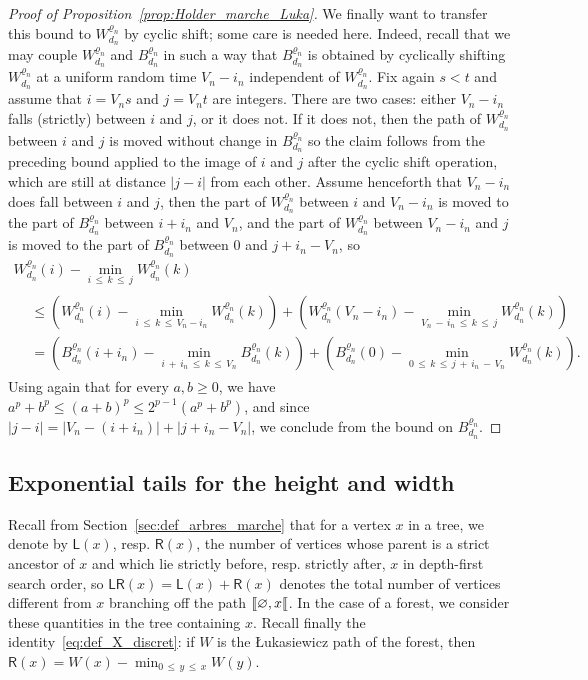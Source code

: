 \documentclass[AHL,Unicode,longabstracts,published]{cedram}
\newcommand{\llbracket}{\mathopen{[\mkern -2.7mu[}}
\newcommand{\1}{\ensembles{1}}
\renewcommand{\le}{\leqslant}
\renewcommand{\ge}{\geqslant}
\newcommand{\LL}{\mathsf{L}}
\newcommand{\RR}{\mathsf{R}}
\newcommand{\LR}{\mathsf{LR}}
\newcommand{\Wfn}{W_{d_n}^{\varrho_n}}
\newcommand{\Bfn}{B_{d_n}^{\varrho_n}}
\newcommand{\vertices}{V}
\begin{document}
\begin{proof}[Proof of Proposition~\ref{prop:Holder_marche_Luka}]
We finally want to transfer this bound to $\Wfn$ by cyclic shift; some care is needed here. Indeed, recall that we may couple $\Wfn$ and $\Bfn$ in such a way that $\Bfn$ is obtained by cyclically shifting $\Wfn$ at a uniform random time $\vertices_n - i_n$ independent of $\Wfn$. Fix again $s<t$ and assume that $i = \vertices_{n} s$ and $ j= \vertices_{n} t$ are integers. There are two cases: either $\vertices_n - i_n$ falls (strictly) between $i$ and $j$, or it does not. If it does not, then the path of $\Wfn$ between $i$ and $j$ is moved without change in $\Bfn$ so the claim follows from the preceding bound applied to the image of $i$ and $j$ after the cyclic shift operation, which are still at distance $|j-i|$ from each other. Assume henceforth that $\vertices_n - i_n$ does fall between $i$ and $j$, then the part of $\Wfn$ between $i$ and $\vertices_n - i_n$ is moved to the part of $\Bfn$ between $i + i_n$ and $\vertices_n$, and the part of $\Wfn$ between $\vertices_n - i_n$ and $j$ is moved to the part of $\Bfn$ between $0$ and $j + i_n - \vertices_n$, so
\begin{multline*}
\Wfn(i) - \min_{i\,\le\,k\,\le\,j} \Wfn(k)
\\
\begin{aligned}
&\le\left(\Wfn(i) - \min_{i\,\le\,k\,\le\,\vertices_n - i_n} \Wfn(k)\right) + \left(\Wfn\left(\vertices_n - i_n\right) - \min_{\vertices_n\,-\,i_n\,\le\,k\,\le\,j} \Wfn(k)\right)
\\
&= \left(\Bfn\left(i+i_{n}\right) - \min_{i\,+\,i_{n}\,\le\,k\,\le\,\vertices_n} \Bfn(k)\right) + \left(\Bfn(0) - \min_{0\,\le\,k\,\le\,j\,+\,i_{n}\,-\,\vertices_n} \Wfn(k)\right).
\end{aligned}
\end{multline*}
Using again that for every $a, b \ge 0$, we have $a^p + b^p \le (a+b)^p \le 2^{p-1} (a^p + b^p)$, and since $|j-i| = |\vertices_n - (i + i_n)| + |j + i_n - \vertices_n|$, we conclude from the bound on $\Bfn$.
\end{proof}


\subsection{Exponential tails for the height and width}\label{sec:queues_exp}

Recall from Section~\ref{sec:def_arbres_marche} that for a vertex $x$ in a tree, we denote by $\LL(x)$, resp. $\RR(x)$, the number of vertices whose parent is a strict ancestor of $x$ and which lie strictly before, resp. strictly after, $x$ in depth-first search order, so $\LR(x) = \LL(x) + \RR(x)$ denotes the total number of vertices different from $x$ branching off the path $\llbracket \varnothing, x\llbracket$. In the case of a forest, we consider these quantities in the tree containing $x$. Recall finally the identity~\eqref{eq:def_X_discret}: if $W$ is the {\L}ukasiewicz path of the forest, then $\RR(x) = W(x) - \min_{0\,\le\,y\,\le\,x} W(y)$.
\end{document}
